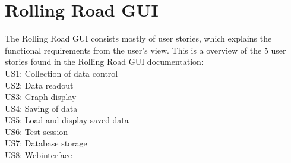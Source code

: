 \section{Rolling Road GUI}
The Rolling Road GUI consists mostly of user stories, which explains the functional requirements from the user's view.
This is a overview of the 5 user stories found in the Rolling Road GUI documentation:\\
US1: Collection of data control\\
US2: Data readout\\
US3: Graph display\\
US4: Saving of data\\
US5: Load and display saved data\\
US6: Test session\\
US7: Database storage\\
US8: Webinterface\\